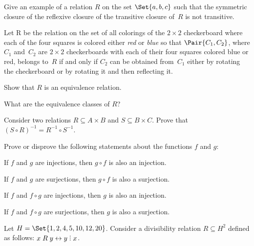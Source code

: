 \documentclass[a4paper,12pt]{article}
\begin{document}
\begin{tasks}
    \item Give an example of a relation $R$ on the set $\Set{a, b, c}$ such that the symmetric closure of the reflexive closure of the
    transitive closure of~$R$ is not transitive.


    \item  Let R be the relation on the set of all colorings of the $2 \times 2$ checkerboard where each of the four squares is colored either \textit{red} or \textit{blue} so that $\Pair{C_1, C_2}$, where $C_1$ and~$C_2$ are $2 \times 2$ checkerboards with each of their four squares colored blue or red, belongs to~$R$ if and only if $C_2$ can be obtained from~$C_1$ either by rotating the checkerboard or by rotating it and then reflecting it.
    \begin{subtasks}
        \item Show that $R$ is an equivalence relation.
        \item What are the equivalence classes of $R$?
    \end{subtasks}


    \item Consider two relations $R \subseteq A \times B$ and $S \subseteq B \times C$.
    Prove that $(S \circ R)^{-1} = R^{-1} \circ S^{-1}$.


    \item Prove or disprove the following statements about the functions $f$ and $g$:

    \begin{subtasks}
        \item If $f$ and $g$ are injections, then $g \circ f$ is also an injection.

        \item If $f$ and $g$ are surjections, then $g \circ f$ is also a surjection.

        \item If $f$ and $f \circ g$ are injections, then $g$ is also an injection.

        \item If $f$ and $f \circ g$ are surjections, then $g$ is also a surjection.
    \end{subtasks}


    \item Let $H = \Set{1, 2, 4, 5, 10, 12, 20}$.
    Consider a divisibility relation $R \subseteq H^2$ defined as follows: $x \rel y \iff y \divby x$.


\end{tasks}
\end{document}
